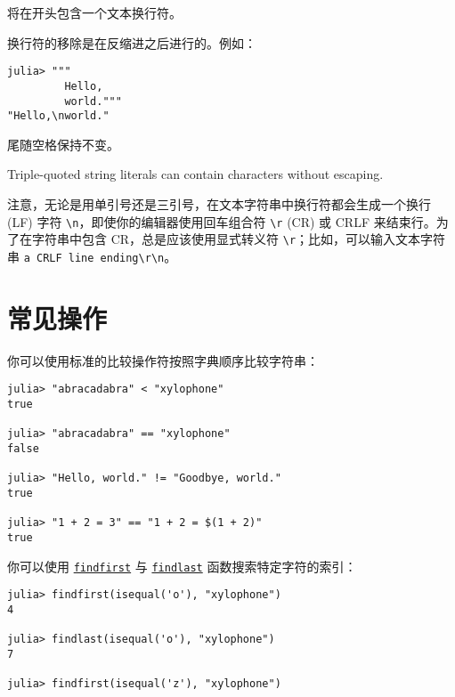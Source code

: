 将在开头包含一个文本换行符。



换行符的移除是在反缩进之后进行的。例如：




\begin{verbatim}
julia> """
         Hello,
         world."""
"Hello,\nworld."
\end{verbatim}



尾随空格保持不变。



Triple-quoted string literals can contain \texttt{{\textquotedbl}} characters without escaping.



注意，无论是用单引号还是三引号，在文本字符串中换行符都会生成一个换行 (LF) 字符 \texttt{{\textbackslash}n}，即使你的编辑器使用回车组合符 \texttt{{\textbackslash}r} (CR) 或 CRLF 来结束行。为了在字符串中包含 CR，总是应该使用显式转义符 \texttt{{\textbackslash}r}；比如，可以输入文本字符串 \texttt{{\textquotedbl}a CRLF line ending{\textbackslash}r{\textbackslash}n{\textquotedbl}}。



\hypertarget{2767013232051989875}{}


\section{常见操作}



你可以使用标准的比较操作符按照字典顺序比较字符串：




\begin{verbatim}
julia> "abracadabra" < "xylophone"
true

julia> "abracadabra" == "xylophone"
false

julia> "Hello, world." != "Goodbye, world."
true

julia> "1 + 2 = 3" == "1 + 2 = $(1 + 2)"
true
\end{verbatim}



你可以使用 \hyperlink{13752961745140943082}{\texttt{findfirst}} 与 \hyperlink{16601358451866933976}{\texttt{findlast}} 函数搜索特定字符的索引：




\begin{verbatim}
julia> findfirst(isequal('o'), "xylophone")
4

julia> findlast(isequal('o'), "xylophone")
7

julia> findfirst(isequal('z'), "xylophone")
\end{verbatim}



